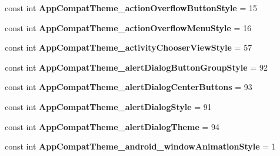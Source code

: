 \begin{DoxyCompactItemize}
const int {\bfseries App\+Compat\+Theme\+\_\+action\+Overflow\+Button\+Style} = 15
\item 
\mbox{\label{class_pinned_app_1_1_droid_1_1_resource_1_1_styleable_a2fd96827ab47ef6502e792300551f32f}} 
const int {\bfseries App\+Compat\+Theme\+\_\+action\+Overflow\+Menu\+Style} = 16
\item 
\mbox{\label{class_pinned_app_1_1_droid_1_1_resource_1_1_styleable_ac481ea73d50f29e757fd93ac9d0a0122}} 
const int {\bfseries App\+Compat\+Theme\+\_\+activity\+Chooser\+View\+Style} = 57
\item 
\mbox{\label{class_pinned_app_1_1_droid_1_1_resource_1_1_styleable_adf05337cb855675fde7214c764f3ed87}} 
const int {\bfseries App\+Compat\+Theme\+\_\+alert\+Dialog\+Button\+Group\+Style} = 92
\item 
\mbox{\label{class_pinned_app_1_1_droid_1_1_resource_1_1_styleable_a50554f77b12a6e3ff3bcdffbe4b4cdd7}} 
const int {\bfseries App\+Compat\+Theme\+\_\+alert\+Dialog\+Center\+Buttons} = 93
\item 
\mbox{\label{class_pinned_app_1_1_droid_1_1_resource_1_1_styleable_ad87da37b09245bfc9457fa185e85528b}} 
const int {\bfseries App\+Compat\+Theme\+\_\+alert\+Dialog\+Style} = 91
\item 
\mbox{\label{class_pinned_app_1_1_droid_1_1_resource_1_1_styleable_af9488df5564f72d7c9ffbca79b4db5a7}} 
const int {\bfseries App\+Compat\+Theme\+\_\+alert\+Dialog\+Theme} = 94
\item 
\mbox{\label{class_pinned_app_1_1_droid_1_1_resource_1_1_styleable_a4c7c28859cc7a60485d6bc000f049644}} 
const int {\bfseries App\+Compat\+Theme\+\_\+android\+\_\+window\+Animation\+Style} = 1
\item 
\mbox{\label{class_pinned_app_1_1_droid_1_1_resource_1_1_styleable_a27523dd30988f5bcceef3d0296ba2d7b}} 

\end{DoxyCompactItemize}
